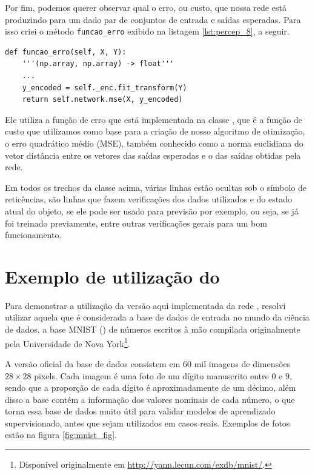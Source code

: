 Por fim, podemos querer observar qual o erro, ou custo, que nossa rede está produzindo para um dado par de conjuntos de entrada e saídas esperadas. Para isso criei o método \texttt{funcao\_erro} exibido na listagem \ref{lst:percep_8}, a seguir. 

\begin{scriptsize}
\estiloR
\begin{lstlisting}[caption={Trecho da classe \eng{Perceptron}}, label={lst:percep_8}, escapeinside={\%}]
def funcao_erro(self, X, Y):
    '''(np.array, np.array) -> float'''
    ...
    y_encoded = self._enc.fit_transform(Y)
    return self.network.mse(X, y_encoded)
\end{lstlisting}
\end{scriptsize}

Ele utiliza a função de erro que está implementada na classe , que é a função de custo que utilizamos como base para a criação de nosso algoritmo de otimização, o erro quadrático médio (MSE), também conhecido como a norma euclidiana do vetor distância entre os vetores das saídas esperadas e o das saídas obtidas pela rede.

Em todos os trechos da classe  acima, várias linhas estão ocultas sob o símbolo de reticências, são linhas que fazem verificações dos dados utilizados e do estado atual do objeto, se ele pode ser usado para previsão por exemplo, ou seja, se já foi treinado previamente, entre outras verificações gerais para um bom funcionamento.

\section{Exemplo de utilização do }

Para demonstrar a utilização da versão aqui implementada da rede , resolvi utilizar aquela que é considerada a base de dados de entrada no mundo da ciência de dados, a base MNIST () de números escritos à mão compilada originalmente pela Universidade de Nova York\footnote{Disponível originalmente em \url{http://yann.lecun.com/exdb/mnist/}.}.

A versão oficial da base de dados consistem em $60$ mil imagens de dimensões $28 \times 28$ pixels. Cada imagem é uma foto de um dígito manuscrito entre $0$ e $9$, sendo que a proporção de cada dígito é aproximadamente de um décimo, além disso a base contém a informação dos valores nominais de cada número, o que torna essa base de dados muito útil para validar modelos de aprendizado supervisionado, antes que sejam utilizados em casos reais. Exemplos de fotos estão na figura \ref{fig:mnist_fig}.

